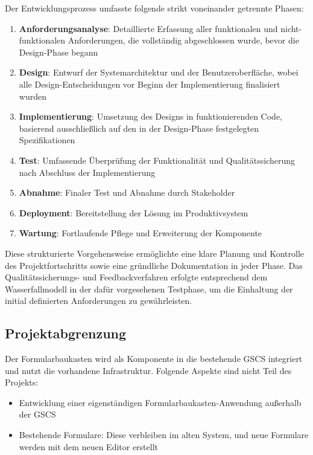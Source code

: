 \documentclass[a4paper,11pt]{article}
\begin{document}
Der Entwicklungsprozess umfasste folgende strikt voneinander getrennte Phasen:
\begin{enumerate}
  \item \textbf{Anforderungsanalyse}: Detaillierte Erfassung aller funktionalen und nicht-funktionalen Anforderungen, die vollständig abgeschlossen wurde, bevor die Design-Phase begann
  \item \textbf{Design}: Entwurf der Systemarchitektur und der Benutzeroberfläche, wobei alle Design-Entscheidungen vor Beginn der Implementierung finalisiert wurden
  \item \textbf{Implementierung}: Umsetzung des Designs in funktionierenden Code, basierend ausschließlich auf den in der Design-Phase festgelegten Spezifikationen
  \item \textbf{Test}: Umfassende Überprüfung der Funktionalität und Qualitätssicherung nach Abschluss der Implementierung
  \item \textbf{Abnahme}: Finaler Test und Abnahme durch Stakeholder
  \item \textbf{Deployment}: Bereitstellung der Lösung im Produktivsystem
  \item \textbf{Wartung}: Fortlaufende Pflege und Erweiterung der Komponente
\end{enumerate}

\noindent Diese strukturierte Vorgehensweise ermöglichte eine klare Planung und Kontrolle des Projektfortschritts sowie eine gründliche Dokumentation in jeder Phase. Das Qualitätssicherungs- und Feedbackverfahren erfolgte entsprechend dem Wasserfallmodell in der dafür vorgesehenen Testphase, um die Einhaltung der initial definierten Anforderungen zu gewährleisten.

\subsection{Projektabgrenzung}
Der Formularbaukasten wird als Komponente in die bestehende GSCS integriert und nutzt die vorhandene Infrastruktur. Folgende Aspekte sind nicht Teil des Projekts:

\begin{itemize}
  \item Entwicklung einer eigenständigen Formularbaukasten-Anwendung außerhalb der GSCS
  \item Bestehende Formulare: Diese verbleiben im alten System, und neue Formulare werden mit dem neuen Editor erstellt
\end{itemize}
\end{document}
